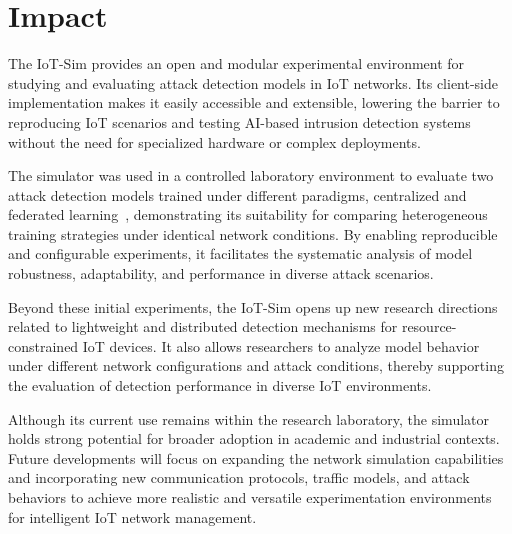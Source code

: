 \section{Impact}
\label{sec:Impact}
The IoT-Sim provides an open and modular experimental environment for studying and evaluating attack detection models in IoT networks. Its client-side implementation makes it easily accessible and extensible, lowering the barrier to reproducing IoT scenarios and testing AI-based intrusion detection systems without the need for specialized hardware or complex deployments.

The simulator was used in a controlled laboratory environment to evaluate two attack detection models trained under different paradigms, centralized and federated learning~\cite{federated_learning}, demonstrating its suitability for comparing heterogeneous training strategies under identical network conditions. By enabling reproducible and configurable experiments, it facilitates the systematic analysis of model robustness, adaptability, and performance in diverse attack scenarios.

Beyond these initial experiments, the IoT-Sim opens up new research directions related to lightweight and distributed detection mechanisms for resource-constrained IoT devices. It also allows researchers to analyze model behavior under different network configurations and attack conditions, thereby supporting the evaluation of detection performance in diverse IoT environments.

Although its current use remains within the research laboratory, the simulator holds strong potential for broader adoption in academic and industrial contexts. Future developments will focus on expanding the network simulation capabilities and incorporating new communication protocols, traffic models, and attack behaviors to achieve more realistic and versatile experimentation environments for intelligent IoT network management.
